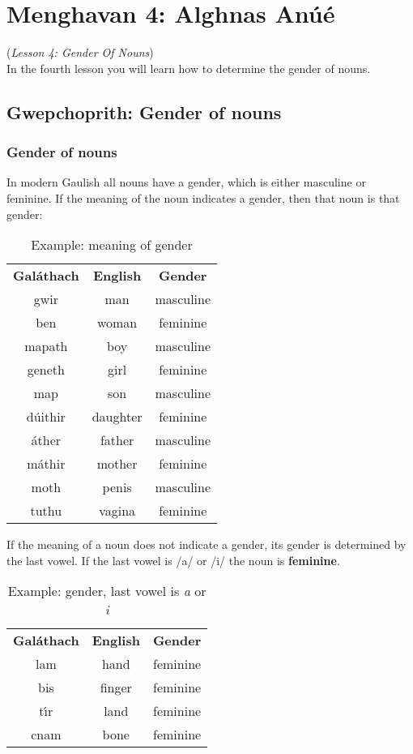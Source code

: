 \section{Menghavan 4: Alghnas An\'{u}\'{e}}
(\textit{Lesson 4: Gender Of Nouns})\\

In the fourth lesson you will learn how to determine the gender of nouns.

\subsection{Gwepchoprith: Gender of nouns}
\subsubsection{Gender of nouns}

In modern Gaulish all nouns have a gender, which is either masculine or feminine. If the meaning of the noun indicates a gender, then that noun is that gender:
\begin{table}[H]
\centering
\begin{tabular}{ccc}
  \toprule
  \textbf{Gal\'{a}thach} & \textbf{English} & \textbf{Gender}\\
  \cmidrule(lr){1-1}\cmidrule(lr){2-2}\cmidrule(lr){3-3}
  gwir & man & masculine\\
  ben & woman & feminine\\
  mapath & boy & masculine\\
  geneth & girl & feminine\\
  map & son & masculine\\
  d\'{u}ithir & daughter & feminine\\
  \'{a}ther & father & masculine\\
  m\'{a}thir & mother & feminine\\
  moth & penis & masculine\\
  tuthu & vagina & feminine\\
  \bottomrule
\end{tabular}
\caption{Example: meaning of gender}
\label{example_gender_meaning}
\end{table}

If the meaning of a noun does not indicate a gender, its gender is determined by the last vowel. If the last vowel is /a/ or /i/ the noun is \textbf{feminine}.
\begin{table}[H]
\centering
\begin{tabular}{ccc}
  \toprule
  \textbf{Gal\'{a}thach} & \textbf{English} & \textbf{Gender}\\
  \cmidrule(lr){1-1}\cmidrule(lr){2-2}\cmidrule(lr){3-3}
  lam & hand & feminine\\
  bis & finger & feminine\\
  t\'{\i}r & land & feminine\\
  cnam & bone & feminine\\
  \bottomrule
\end{tabular}
\caption{Example: gender, last vowel is \textit{a} or \textit{i}}
\label{example_gender_last_vowel_ai}
\end{table}


